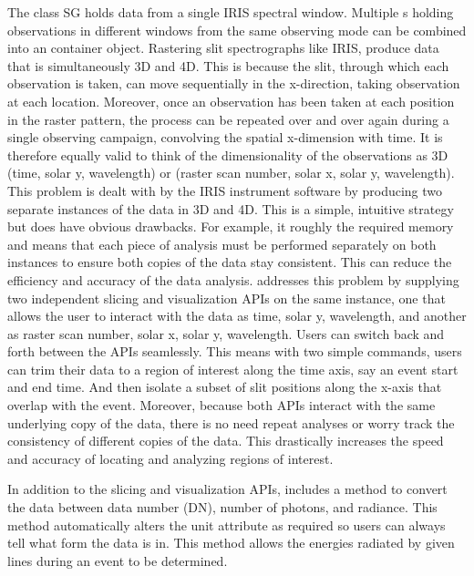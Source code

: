 The  class SG holds data from a single IRIS spectral window.
Multiple s holding observations in different windows from the same observing mode can be combined into an  container object.
Rastering slit spectrographs like IRIS, produce data that is simultaneously 3D and 4D.
This is because the slit, through which each observation is taken, can move sequentially in the x-direction, taking observation at each location.
Moreover, once an observation has been taken at each position in the raster pattern, the process can be repeated over and over again during a single observing campaign, convolving the spatial x-dimension with time.
It is therefore equally valid to think of the dimensionality of the observations as 3D (time, solar y, wavelength) or (raster scan number, solar x, solar y, wavelength).
This problem is dealt with by the IRIS instrument software by producing two separate instances of the data in 3D and 4D.
This is a simple, intuitive strategy but does have obvious drawbacks.
For example, it roughly the required memory and means that each piece of analysis must be performed separately on both instances to ensure both copies of the data stay consistent.
This can reduce the efficiency and accuracy of the data analysis.
 addresses this problem by supplying two independent slicing and visualization APIs on the same instance, one that allows the user to interact with the data as time, solar y, wavelength, and another as raster scan number, solar x, solar y, wavelength.
Users can switch back and forth between the APIs seamlessly.
This means with two simple commands, users can trim their data to a region of interest along the time axis, say an event start and end time.
And then isolate a subset of slit positions along the x-axis that overlap with the event.
Moreover, because both APIs interact with the same underlying copy of the data, there is no need repeat analyses or worry track the consistency of different copies of the data.
This drastically increases the speed and accuracy of locating and analyzing regions of interest.

In addition to the slicing and visualization APIs,  includes a method to convert the data between data number (DN), number of photons, and radiance.
This method automatically alters the unit attribute as required so users can always tell what form the data is in.
This method allows the energies radiated by given lines during an event to be determined.

